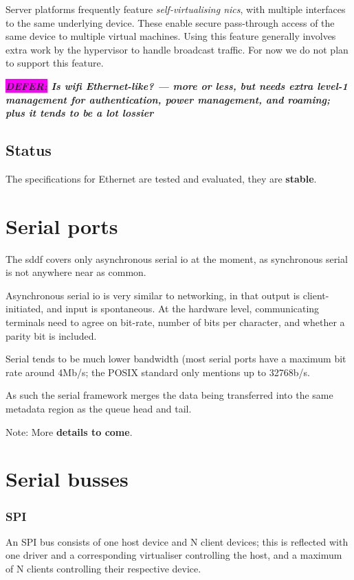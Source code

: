 \documentclass[a4paper,12pt]{report}
\newcommand{\DEFER}[1]{\textbf{\textsl{\colorbox{magenta}{DEFER:} #1}}}
\newcommand{\DEFER}[1]{\relax}
\begin{document}
Server platforms frequently feature \emph{self-virtualising
  \glspl{nic}}, with multiple interfaces to the same underlying
device. These enable secure pass-through access of the same device to
multiple virtual machines.  Using this feature generally involves
extra work by the hypervisor to handle broadcast traffic. For now we
do not plan to support this feature.

\DEFER{Is wifi Ethernet-like? --- more or less, but needs extra
  level-1 management for authentication, power management, and
  roaming; plus it tends to be a lot lossier}

\subsection{Status}

The specifications for Ethernet are tested and evaluated, they are
\textbf{stable}.

\section{Serial ports}\label{s:cl-serial}

The \gls{sddf} covers only asynchronous serial \gls{io} at the moment, as
synchronous serial is not anywhere near as common.

Asynchronous serial \gls{io} is very similar to networking, in that output is
client-initiated, and input is spontaneous.  At the hardware level,
communicating terminals need to agree on bit-rate, number of bits per
character, and whether a parity bit is included.

Serial tends to be much lower bandwidth (most serial ports have a
maximum bit rate around 4Mb/s; the POSIX standard only mentions up to
32768b/s.

As such the serial framework merges the data being transferred into
the same metadata region as the queue head and tail.

Note: More \textbf{details to come}.


\section{Serial busses}\label{s:cl-bus}

\subsubsection{SPI}\label{s:cl-spi}

An SPI bus consists of one host device and N client devices; this is reflected with one driver and a
corresponding virtualiser controlling the host, and a maximum of N clients controlling their 
respective device. 
\end{document}
